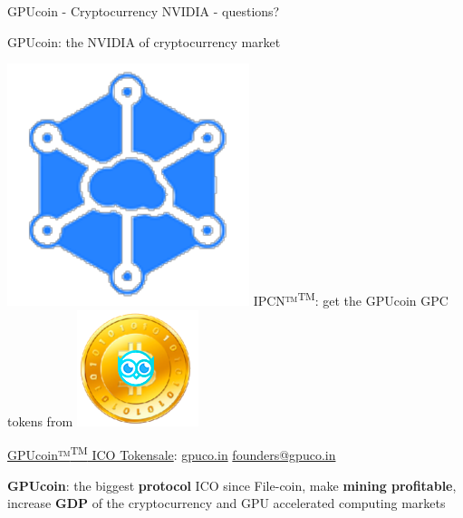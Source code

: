 \documentclass[10pt,handout]{beamer}
\begin{document}
\begin{frame}[standout]{GPUcoin - Cryptocurrency NVIDIA - questions?}
\begin{center}
GPUcoin: the NVIDIA of cryptocurrency market 
\end{center}


\includegraphics[scale=.3]{static/ipcn-p2p}
IPCN™\textsuperscript{TM}: get the GPUcoin GPC tokens from
\includegraphics[scale=0.3]{static/hootcoin} 


 \begin{center}
\href{https://j.mp/gpucoins}{GPUcoin™\textsuperscript{TM} ICO Tokensale}: 
\href{http://gpuco.in}{gpuco.in}
\href{mailto:founders@gpuco.in}{founders@gpuco.in} 
 \end{center}
\begin{center}

\textbf{GPUcoin}: the biggest \textbf{protocol} ICO since File-coin, make \textbf{mining profitable}, increase \textbf{GDP} of the cryptocurrency and GPU accelerated computing markets
\end{center}




 \begin{center}\ccbysa\end{center}

\end{frame}
\end{document}
